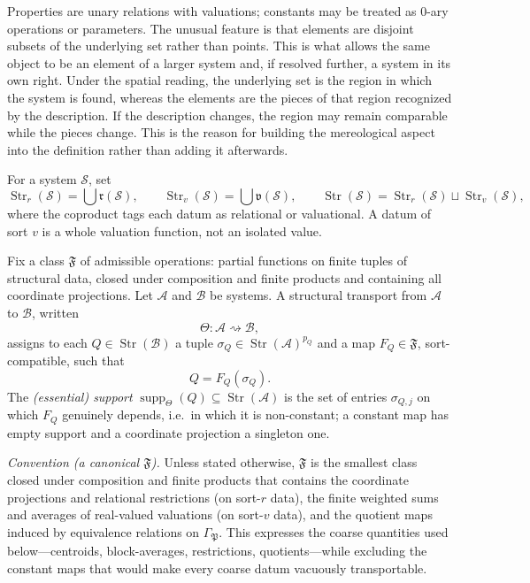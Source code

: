 \documentclass[runningheads]{llncs}
\newcommand{\Str}{\operatorname{Str}}
\newcommand{\supp}{\operatorname{supp}}
\begin{document}
Properties are unary relations with valuations; constants may be treated as $0$-ary operations or parameters. The unusual feature is that elements are disjoint subsets of the underlying set rather than points. This is what allows the same object to be an element of a larger system and, if resolved further, a system in its own right. Under the spatial reading, the underlying set is the region in which the system is found, whereas the elements are the pieces of that region recognized by the description. If the description changes, the region may remain comparable while the pieces change. This is the reason for building the mereological aspect into the definition rather than adding it afterwards.

For a system $\mathcal S$, set
\[
\Str_r(\mathcal S)=\bigcup\mathfrak r(\mathcal S),\qquad
\Str_v(\mathcal S)=\bigcup\mathfrak v(\mathcal S),\qquad
\Str(\mathcal S)=\Str_r(\mathcal S)\sqcup\Str_v(\mathcal S),
\]
where the coproduct tags each datum as relational or valuational. A datum of sort $v$ is a whole valuation function, not an isolated value.

\begin{definition}\label{def::transport}
Fix a class $\mathfrak F$ of admissible operations: partial functions on finite tuples of structural data, closed under composition and finite products and containing all coordinate projections. Let $\mathcal A$ and $\mathcal B$ be systems. A structural transport from $\mathcal A$ to $\mathcal B$, written
\[
\Theta:\mathcal A\rightsquigarrow\mathcal B,
\]
assigns to each $Q\in\Str(\mathcal B)$ a tuple $\sigma_Q\in\Str(\mathcal A)^{p_Q}$ and a map $F_Q\in\mathfrak F$, sort-compatible, such that
\[
Q=F_Q(\sigma_Q).
\]
The \emph{(essential) support} $\supp_\Theta(Q)\subseteq\Str(\mathcal A)$ is the set of entries $\sigma_{Q,j}$ on which $F_Q$ genuinely depends, i.e.\ in which it is non-constant; a constant map has empty support and a coordinate projection a singleton one.
\end{definition}

\noindent\emph{Convention (a canonical $\mathfrak F$).} Unless stated otherwise, $\mathfrak F$ is the smallest class closed under composition and finite products that contains the coordinate projections and relational restrictions (on sort-$r$ data), the finite weighted sums and averages of real-valued valuations (on sort-$v$ data), and the quotient maps induced by equivalence relations on $\Gamma_{\mathfrak P}$. This expresses the coarse quantities used below---centroids, block-averages, restrictions, quotients---while excluding the constant maps that would make every coarse datum vacuously transportable.
\end{document}
